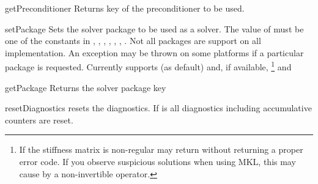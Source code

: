 \begin{methoddesc}[SolverOptions]{getPreconditioner}{}
Returns key of the preconditioner to be used. 
\end{methoddesc}

\begin{methoddesc}[SolverOptions]{setPackage}{}
Sets the solver package to be used as a solver.  
The value of  must be one of the constants in , , , , , , .
Not all packages are support on all implementation. An exception may be thrown on some platforms if a particular package is requested. Currently \finley supports  (as default)
and, if available, 
\footnote{If the stiffness matrix is non-regular \MKL may return without 
returning a proper error code. If you observe suspicious solutions when using MKL, this may cause by a non-invertible operator. }
and 

\end{methoddesc}

\begin{methoddesc}[SolverOptions]{getPackage}{}
Returns the solver package key
\end{methoddesc}


\begin{methoddesc}[SolverOptions]{resetDiagnostics}{}
resets the diagnostics. If  is \True all diagnostics including accumulative counters are reset.
\end{methoddesc}

